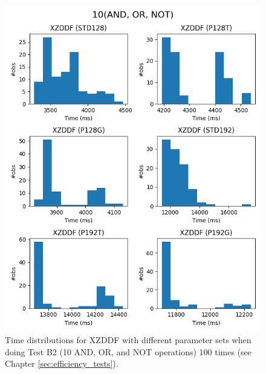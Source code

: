 \begin{figure}[ht]
    \centering
    \includegraphics[width=\textwidth]{data/figures/10AND_OR_NOT_distributions_2.png}
    \caption{Time distributions for XZDDF with different parameter sets when doing Test B2 (10 AND, OR, and NOT operations) 100 times (see Chapter \ref{sec:efficiency_tests}).}
    \label{fig:distr_10andornot2}
\end{figure}


